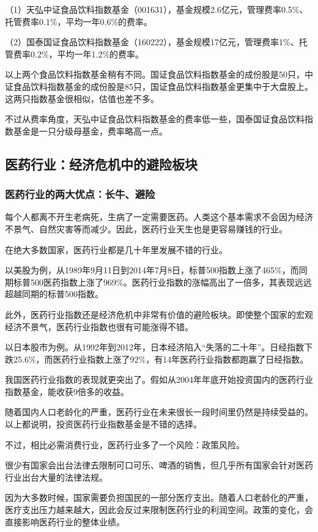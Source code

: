 （1）天弘中证食品饮料指数基金（001631），基金规模2.6亿元，管理费率0.5\%、托管费率0.1\%，平均一年0.6\%的费率。

（2）国泰国证食品饮料指数基金（160222），基金规模17亿元，管理费率1\%、托管费率0.2\%，平均一年1.2\%的费率。

以上两个食品饮料指数基金稍有不同。国证食品饮料指数基金的成份股是50只，中证食品饮料指数基金的成份股是85只，国证食品饮料指数基金更集中于大盘股上。这两只指数基金很相似，估值也差不多。

不过从费率角度，天弘中证食品饮料指数基金的费率低一些，国泰国证食品饮料指数基金是一只分级母基金，费率略高一点。

\subsection{医药行业：经济危机中的避险板块}
\subsubsection{医药行业的两大优点：长牛、避险}

每个人都离不开生老病死，生病了一定需要医药。人类这个基本需求不会因为经济不景气、自然灾害等而减少。因此，医药行业天生也是更容易赚钱的行业。

在绝大多数国家，医药行业都是几十年里发展不错的行业。

{\kaishu 以美股为例，从1989年9月11日到2014年7月8日，标普500指数上涨了465\%，而同期标普500医药指数上涨了969\%。医药行业指数的涨幅高出了一倍多，其表现远远超越同期的标普500指数。}

此外，医药行业指数还是经济危机中非常有价值的避险板块。即使整个国家的宏观经济不景气，医药行业指数也很有可能涨得不错。

{\kaishu 以日本股市为例。从1992年到2012年，日本经济陷入“失落的二十年”。日经指数下跌25.6\%，而医药行业指数上涨了92\%，有14年医药行业指数都跑赢了日经指数。}

我国医药行业指数的表现就更突出了。假如从2004年年底开始投资国内的医药行业指数基金，能收获9倍多的收益。

随着国内人口老龄化的严重，医药行业在未来很长一段时间里仍然是持续受益的。以上都说明，投资医药行业指数基金是不错的选择。

不过，相比必需消费行业，医药行业多了一个风险：政策风险。

很少有国家会出台法律去限制可口可乐、啤酒的销售，但几乎所有国家会针对医药行业出台大量的法律法规。

因为大多数时候，国家需要负担国民的一部分医疗支出。随着人口老龄化的严重，医疗支出压力越来越大，因此会反过来限制医药行业的利润空间。政策的变化，会直接影响医药行业的整体业绩。

